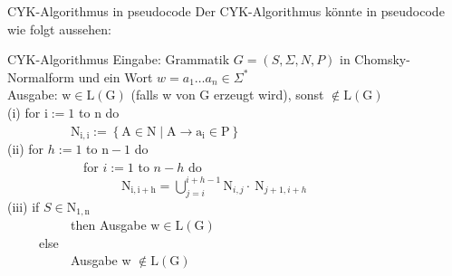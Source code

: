 \documentclass{beamer}
\begin{document}
	\begin{frame}{CYK-Algorithmus in pseudocode}
		Der CYK-Algorithmus könnte in pseudocode wie folgt aussehen:	
		\begin{block}{CYK-Algorithmus}
			Eingabe: Grammatik $G = (S, \Sigma, N, P)$ in Chomsky-Normalform und ein Wort $w=a_1 \ldots a_n \in \Sigma^*$\\
			Ausgabe: $\mathrm{w} \in \mathrm{L}(\mathrm{G})$ (falls w von G erzeugt wird), sonst $\notin \mathrm{L}(\mathrm{G})$\\
			(i) for $\mathrm{i}:=1$ to $\mathrm{n}$ do\\
			\ \ \ \ \ \ \ \ \ \ $\mathrm{N}_{\mathrm{i}, \mathrm{i}}:=\left\{\mathrm{A} \in \mathrm{N} \mid \mathrm{A} \rightarrow \mathrm{a}_{\mathrm{i}} \in \mathrm{P}\right\}$\\
			(ii) for $h:=1$ to $\mathrm{n}-1$ do\\
			\ \ \ \ \ \ \ \ \ \ \ \ for $i:=1$ to $n-h$ do\\
			\ \ \ \ \ \ \ \ \ \ \ \ \ \ \ \ \ \ $\mathrm{N}_{\mathrm{i}, \mathrm{i}+\mathrm{h}}=\bigcup_{j=i}^{i+h-1} \mathrm{N}_{i, j} \cdot \mathrm{~N}_{j+1, i+h}$\\
			(iii) if $S \in \mathrm{N}_{1, \mathrm{n}}$\\
			\ \ \ \ \ \ \ \ \ \ then Ausgabe $\mathrm{w} \in \mathrm{L}(\mathrm{G})$\\
			\ \ \ \ \ else\\
			\ \ \ \ \ \ \ \ \ \  Ausgabe w $\notin \mathrm{L}(\mathrm{G})$
		\end{block}
	\end{frame}
\end{document}
